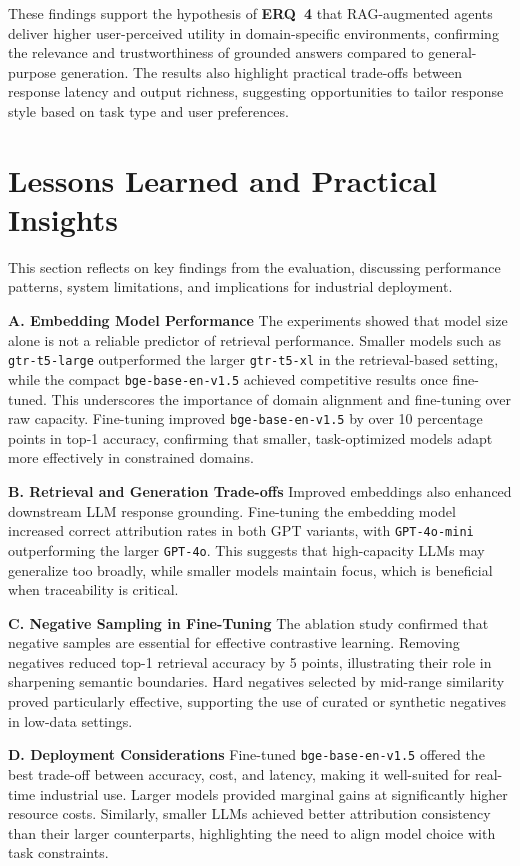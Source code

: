 \documentclass[a4paper,fleqn]{cas-dc}
\renewcommand{\textit}[1]{#1}
\begin{document}
These findings support the hypothesis of \textbf{\textit{ERQ~4}} that RAG-augmented agents deliver higher user-perceived utility in domain-specific environments, confirming the relevance and trustworthiness of grounded answers compared to general-purpose generation. The results also highlight practical trade-offs between response latency and output richness, suggesting opportunities to tailor response style based on task type and user preferences.  


\section{Lessons Learned and Practical Insights}
\label{sec:dis}
This section reflects on key findings from the evaluation, discussing performance patterns, system limitations, and implications for industrial deployment.

\textbf{A. Embedding Model Performance} The experiments showed that model size alone is not a reliable predictor of retrieval performance. Smaller models such as \texttt{gtr-t5-large} outperformed the larger \texttt{gtr-t5-xl} in the retrieval-based setting, while the compact \texttt{bge-base-en-v1.5} achieved competitive results once fine-tuned. This underscores the importance of domain alignment and fine-tuning over raw capacity. Fine-tuning improved \texttt{bge-base-en-v1.5} by over 10 percentage points in top-1 accuracy, confirming that smaller, task-optimized models adapt more effectively in constrained domains.

\textbf{B. Retrieval and Generation Trade-offs} Improved embeddings also enhanced downstream LLM response grounding. Fine-tuning the embedding model increased correct attribution rates in both GPT variants, with \texttt{GPT-4o-mini} outperforming the larger \texttt{GPT-4o}. This suggests that high-capacity LLMs may generalize too broadly, while smaller models maintain focus, which is beneficial when traceability is critical.


\textbf{C. Negative Sampling in Fine-Tuning} The ablation study confirmed that negative samples are essential for effective contrastive learning. Removing negatives reduced top-1 retrieval accuracy by 5 points, illustrating their role in sharpening semantic boundaries. Hard negatives selected by mid-range similarity proved particularly effective, supporting the use of curated or synthetic negatives in low-data settings.

\textbf{D. Deployment Considerations} Fine-tuned \texttt{bge-base-en-v1.5} offered the best trade-off between accuracy, cost, and latency, making it well-suited for real-time industrial use. Larger models provided marginal gains at significantly higher resource costs. Similarly, smaller LLMs achieved better attribution consistency than their larger counterparts, highlighting the need to align model choice with task constraints.
\end{document}
